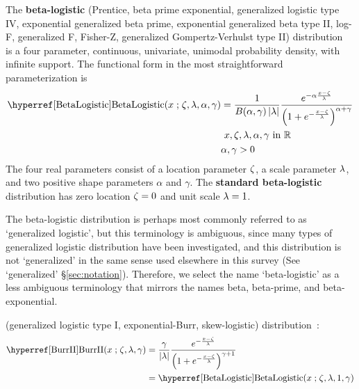 


\label{sec:BetaLogistic} 
{} 
{}  



The {\bf beta-logistic } (Prentice, beta prime exponential, generalized logistic type IV, exponential generalized beta prime, exponential generalized beta type II, log-F, generalized F, Fisher-Z, generalized Gompertz-Verhulst type II) distribution~\cite{Prentice1976, McDonald1991, Johnson1995, Morton2000}
 is a four parameter, continuous, univariate, unimodal probability density, with infinite  support. The functional form in the most straightforward parameterization is
\begin{align}
\notag
\label{BetaLogistic}
\opr{BetaLogistic}(x\given  \pLoc, \pScale,\alpha,\gamma) 
& =
 \frac{1}{B(\alpha, \gamma) \left| \pScale\right|}
 \frac{e^{-\alpha \frac{x-\pLoc}{\pScale} }} { \left(1 + e^{-\frac{x-\pLoc}{\pScale}  }\right)^{\alpha+\gamma} } \checked
\\  &
\ x, \pLoc, \pScale,\alpha,\gamma \text{ in } {\mathbb R}
\\ \notag & \alpha,\gamma >0
\end{align}
The four real parameters consist of a location parameter $\zeta$, a scale parameter $\lambda$, and two positive shape parameters $\alpha$ and $\gamma$.  The {\bf standard beta-logistic} distribution has zero location $\zeta=0$ and unit scale $\lambda=1$.

The beta-logistic distribution is perhaps most commonly referred to as `generalized logistic', but this terminology is ambiguous, since many types of generalized logistic distribution have been investigated, and this distribution is not `generalized' in the same sense used elsewhere in this survey (See `generalized' \S \ref{sec:notation}). Therefore, we select the name `beta-logistic' as a less ambiguous terminology that mirrors the names beta, beta-prime, and beta-exponential.





 (generalized logistic type I, exponential-Burr, skew-logistic) distribution~\cite{Burr1942,Johnson1994}:
\begin{align}
\label{BurrII}
\opr{BurrII}(x\given \pLoc, \pScale,  \gamma) 
& = \frac{\gamma}{|\pScale|} \frac{e^{- \frac{x-\pLoc}{\pScale} } } { \left(1 + e^{-\frac{x-\pLoc}{\pScale}  }\right)^{\gamma+1} }
\checked
\\
& = \opr{BetaLogistic}(x\given \pLoc, \pScale, 1, \gamma) \checked
\notag
\end{align}

